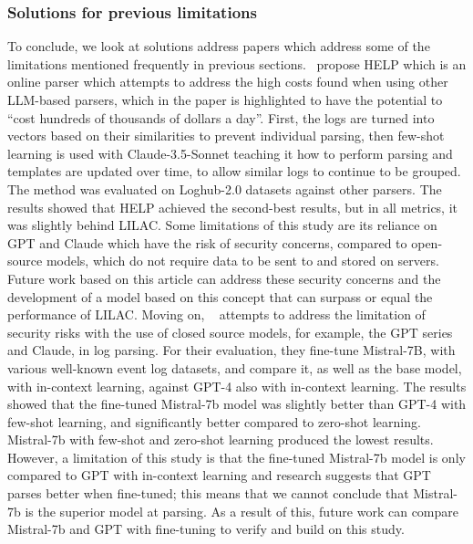 \subsubsection{Solutions for previous limitations}
To conclude, we look at solutions address papers which address some of the limitations mentioned frequently in previous sections.~\cite{xu2024help} propose HELP which is an online parser which attempts to address the high costs found when using other LLM-based parsers, which in the paper is highlighted to have the potential to ``cost hundreds of thousands of dollars a day''. First, the logs are turned into vectors based on their similarities to prevent individual parsing, then few-shot learning is used with Claude-3.5-Sonnet teaching it how to perform parsing and templates are updated over time, to allow similar logs to continue to be grouped. The method was evaluated on Loghub-2.0 datasets against other parsers. The results showed that HELP achieved the second-best results, but in all metrics, it was slightly behind LILAC. Some limitations of this study are its reliance on GPT and Claude which have the risk of security concerns, compared to open-source models, which do not require data to be sent to and stored on servers. Future work based on this article can address these security concerns and the development of a model based on this concept that can surpass or equal the performance of LILAC. Moving on, ~\cite{mehrabieffectiveness} attempts to address the limitation of security risks with the use of closed source models, for example, the GPT series and Claude, in log parsing. For their evaluation, they fine-tune Mistral-7B, with various well-known event log datasets, and compare it, as well as the base model, with in-context learning, against GPT-4 also with in-context learning. The results showed that the fine-tuned Mistral-7b model was slightly better than GPT-4 with few-shot learning, and significantly better compared to zero-shot learning. Mistral-7b with few-shot and zero-shot learning produced the lowest results. However, a limitation of this study is that the fine-tuned Mistral-7b model is only compared to GPT with in-context learning and research suggests that GPT parses better when fine-tuned; this means that we cannot conclude that Mistral-7b is the superior model at parsing. As a result of this, future work can compare Mistral-7b and GPT with fine-tuning to verify and build on this study. 

